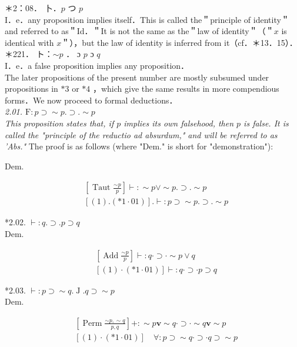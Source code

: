 \documentclass[10pt]{article}
\begin{document}
＊2：08． 卜．$p$ つ $p$\\
I．e．any proposition implies itself．This is called the＂principle of identity＂ and referred to as＂Id．＂It is not the same as the＂law of identity＂（＂$x$ is identical with $x$＂），but the law of identity is inferred from it（cf．＊13．15）．\\
＊221． ト：$\sim p$ ． ɔ $p$ ɔ $q$\\
I．e．a false proposition implies any proposition．\\
The later propositions of the present number are mostly subsumed under propositions in $* 3$ or $* 4$ ，which give the same results in more compendious forms．We now proceed to formal deductions．\\
\textit{2.01. $\mathrm{F}: p \supset \sim p . \supset . \sim p$\\
This proposition states that, if $p$ implies its own falsehood, then $p$ is false. It is called the "principle of the reductio ad absurdum," and will be referred to as 'Abs."} The proof is as follows (where "Dem." is short for "demonstration"):

Dem.


\begin{align*}
& {\left[\text { Taut } \frac{\sim p}{p}\right] \vdash: \sim p \vee \sim p . \supset . \sim p}  \tag{1}\\
& {[(1) .(* 1 \cdot 01)] . \vdash: p \supset \sim p . \supset . \sim p}
\end{align*}


*2.02. $\vdash: q . \supset . p \supset q$\\
Dem.


\begin{align*}
& {\left[\operatorname{Add} \frac{\sim p}{p}\right] \vdash: q \cdot \supset \cdot \sim p \vee q}  \tag{1}\\
& {[(1) \cdot(* 1 \cdot 01)] \vdash: q \cdot \supset \cdot p \supset q}
\end{align*}


*2.03. $\vdash: p \supset \sim q . \operatorname{J} . q \supset \sim p$\\
Dem.


\begin{align*}
& {\left[\operatorname{Perm} \frac{\sim p, \sim q}{p, q}\right]+: \sim p \mathbf{v} \sim q \cdot \supset \cdot \sim q \mathbf{v} \sim p}  \tag{1}\\
& {[(1) \cdot(* 1 \cdot 01)] \quad \forall: p \supset \sim q \cdot \supset \cdot q \supset \sim p}
\end{align*}
\end{document}
